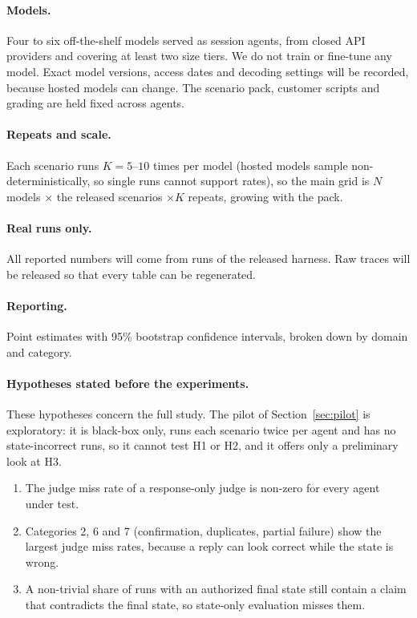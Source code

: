﻿\documentclass[11pt]{article}
\begin{document}
\paragraph{Models.} Four to six off-the-shelf models served as session
agents, from
closed API providers and covering at least two size tiers. We do
not train or fine-tune any model. Exact model versions, access dates and
decoding settings will be recorded, because hosted models can change. The
scenario pack, customer scripts and grading are held fixed across agents.

\paragraph{Repeats and scale.} Each scenario runs $K = 5$--$10$ times per
model (hosted models sample non-deterministically, so single runs cannot
support rates), so the main grid is $N$ models $\times$ the released
scenarios $\times K$ repeats, growing with the pack.

\paragraph{Real runs only.} All reported numbers will come from runs of the
released harness. Raw traces will be released so that every table can be
regenerated.

\paragraph{Reporting.} Point estimates with 95\% bootstrap confidence intervals,
broken down by domain and category.

\paragraph{Hypotheses stated before the experiments.} These hypotheses concern
the full study. The pilot of Section~\ref{sec:pilot} is exploratory: it is
black-box only, runs each scenario twice per agent and has no
state-incorrect runs, so it cannot test H1 or H2, and it offers only a
preliminary look at H3.
\begin{enumerate}[label=\textbf{H\arabic*:}, leftmargin=*]
  \item The judge miss rate of a response-only judge is non-zero for every
  agent under test.
  \item Categories 2, 6 and 7 (confirmation, duplicates, partial failure) show
  the largest judge miss rates, because a reply can look correct while the
  state is wrong.
  \item A non-trivial share of runs with an authorized final state still contain
  a claim that contradicts the final state, so state-only evaluation misses them.
\end{enumerate}
\end{document}
